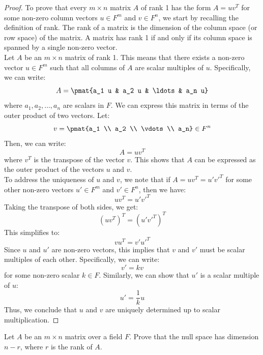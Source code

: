 \documentclass[openany]{book}
\begin{document}
\begin{proof}
To prove that every $m \times n$ matrix $A$ of rank 1 has the form $A = uv^T$ for some non-zero column vectors $u \in F^m$ and $v \in F^n$, we start by recalling the definition of rank. The rank of a matrix is the dimension of the column space (or row space) of the matrix. A matrix has rank 1 if and only if its column space is spanned by a single non-zero vector. \\ 
Let $A$ be an $m \times n$ matrix of rank 1. This means that there exists a non-zero vector $u \in F^m$ such that all columns of $A$ are scalar multiples of $u$. Specifically, we can write:
$$A = \pmat{a_1 u & a_2 u & \ldots & a_n u}$$
where $a_1, a_2, \ldots, a_n$ are scalars in $F$. We can express this matrix in terms of the outer product of two vectors. Let: 
$$v = \pmat{a_1 \\ a_2 \\ \vdots \\ a_n} \in F^n$$
Then, we can write:
$$A = u v^T$$
where $v^T$ is the transpose of the vector $v$. This shows that $A$ can be expressed as the outer product of the vectors $u$ and $v$. \\
To address the uniqueness of $u$ and $v$, we note that if $A = uv^T = u'v'^T$ for some other non-zero vectors $u' \in F^m$ and $v' \in F^n$, then we have:
$$uv^T = u'v'^T$$
Taking the transpose of both sides, we get:
$$(uv^T)^T = (u'v'^T)^T$$
This simplifies to:
$$v u^T = v' u'^T$$
Since $u$ and $u'$ are non-zero vectors, this implies that $v$ and $v'$ must be scalar multiples of each other. Specifically, we can write:
$$v' = k v$$
for some non-zero scalar $k \in F$. Similarly, we can show that $u'$ is a scalar multiple of $u$:
$$u' = \frac{1}{k} u$$
Thus, we conclude that $u$ and $v$ are uniquely determined up to scalar multiplication.
\end{proof}
\begin{exercise}
    Let $A$ be an $m \times n$ matrix over a field $F$. Prove that the null space has dimension $n - r$, where $r$ is the rank of $A$.
\end{exercise}
\end{document}
